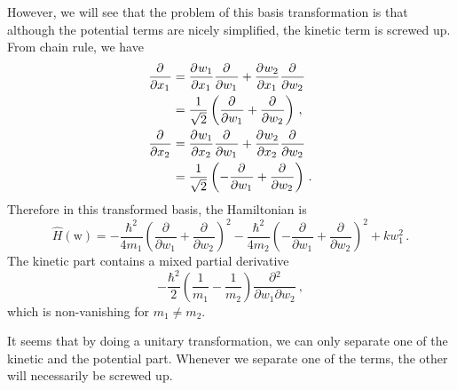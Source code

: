 \documentclass{article}
\theoremstyle{plain}\theoremheaderfont{\normalfont\itshape}\theorembodyfont{\rmfamily}\theoremseparator{.}\newtheorem*{rem}{Remark}\newtheorem*{ex}{Example}\newtheorem*{proof}{Proof}\newtheorem*{altp}{Alternative proof}
\theoremstyle{plain}\theoremheaderfont{\normalfont\bfseries}\theorembodyfont{\rmfamily}\theoremseparator{.}\newtheorem{thm}{Theorem}[section]\newtheorem{lem}[thm]{Lemma}\newtheorem{prop}[thm]{Proposition}\newtheorem*{cor}{Corollary}\newtheorem{defn}[thm]{Definition}\newtheorem{clm}[thm]{Claim}\newtheorem{clminproof}{Claim}
\theoremstyle{break}\theoremheaderfont{\normalfont\itshape}\theorembodyfont{\rmfamily}\theoremseparator{.\medskip}\newtheorem*{proofskip}{Proof}\newtheorem*{exs}{Examples}\newtheorem*{rems}{Remarks}
\theoremstyle{break}\theoremheaderfont{\normalfont\bfseries}\theorembodyfont{\rmfamily}\theoremseparator{.\medskip}\newtheorem{lemskip}[thm]{Lemma}\newtheorem{defnskip}[thm]{Definition}\newtheorem{propskip}[thm]{Proposition}\newtheorem{thmskip}[thm]{Theorem}
\numberwithin{equation}{section}
\newcommand{\pdv}[3][]{\frac{\partial^{#1} #2}{{\partial #3}^{#1}}}
\newcommand{\vb}[1]{\bm{\mathrm{#1}}}
\begin{document}
    However, we will see that the problem of this basis transformation is that although the potential terms are nicely simplified, the kinetic term is screwed up. From chain rule, we have
    \begin{align}
        \pdv{}{x_1}&=\pdv{w_1}{x_1}\pdv{}{w_1}+\pdv{w_2}{x_1}\pdv{}{w_2}\notag\\
        &=\frac{1}{\sqrt{2}}\left(\pdv{}{w_1}+\pdv{}{w_2}\right)\,,\\
        \pdv{}{x_2}&=\pdv{w_1}{x_2}\pdv{}{w_1}+\pdv{w_2}{x_2}\pdv{}{w_2}\notag\\
        &=\frac{1}{\sqrt{2}}\left(-\pdv{}{w_1}+\pdv{}{w_2}\right)\,.
    \end{align}
    Therefore in this transformed basis, the Hamiltonian is
    \begin{equation}
        \hat{H}(\vb{w})=-\frac{\hbar^2}{4m_1}\left(\pdv{}{w_1}+\pdv{}{w_2}\right)^2-\frac{\hbar^2}{4m_2}\left(-\pdv{}{w_1}+\pdv{}{w_2}\right)^2+kw_1^2\,.
    \end{equation}
    The kinetic part contains a mixed partial derivative
    \begin{equation}
        -\frac{\hbar^2}{2}\left(\frac{1}{m_1}-\frac{1}{m_2}\right)\pdv{{}^2}{w_1\partial w_2}\,,
    \end{equation}
    which is non-vanishing for \(m_1\ne m_2\).

    It seems that by doing a unitary transformation, we can only separate one of the kinetic and the potential part. Whenever we separate one of the terms, the other will necessarily be screwed up.
\end{document}
